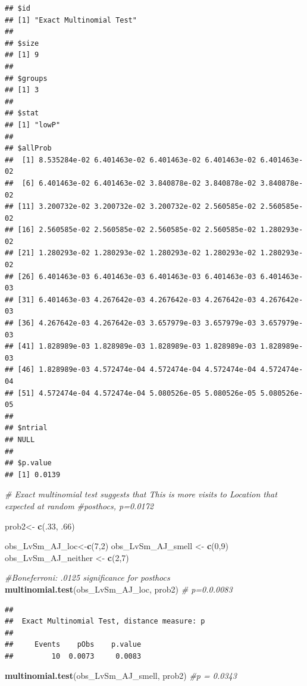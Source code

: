 \documentclass[]{article}
\newenvironment{Shaded}{\begin{snugshade}}{\end{snugshade}}
\newcommand{\KeywordTok}[1]{\textcolor[rgb]{0.13,0.29,0.53}{\textbf{{#1}}}}
\newcommand{\DecValTok}[1]{\textcolor[rgb]{0.00,0.00,0.81}{{#1}}}
\newcommand{\StringTok}[1]{\textcolor[rgb]{0.31,0.60,0.02}{{#1}}}
\newcommand{\CommentTok}[1]{\textcolor[rgb]{0.56,0.35,0.01}{\textit{{#1}}}}
\newcommand{\NormalTok}[1]{{#1}}
\begin{document}
\begin{verbatim}
## $id
## [1] "Exact Multinomial Test"
## 
## $size
## [1] 9
## 
## $groups
## [1] 3
## 
## $stat
## [1] "lowP"
## 
## $allProb
##  [1] 8.535284e-02 6.401463e-02 6.401463e-02 6.401463e-02 6.401463e-02
##  [6] 6.401463e-02 6.401463e-02 3.840878e-02 3.840878e-02 3.840878e-02
## [11] 3.200732e-02 3.200732e-02 3.200732e-02 2.560585e-02 2.560585e-02
## [16] 2.560585e-02 2.560585e-02 2.560585e-02 2.560585e-02 1.280293e-02
## [21] 1.280293e-02 1.280293e-02 1.280293e-02 1.280293e-02 1.280293e-02
## [26] 6.401463e-03 6.401463e-03 6.401463e-03 6.401463e-03 6.401463e-03
## [31] 6.401463e-03 4.267642e-03 4.267642e-03 4.267642e-03 4.267642e-03
## [36] 4.267642e-03 4.267642e-03 3.657979e-03 3.657979e-03 3.657979e-03
## [41] 1.828989e-03 1.828989e-03 1.828989e-03 1.828989e-03 1.828989e-03
## [46] 1.828989e-03 4.572474e-04 4.572474e-04 4.572474e-04 4.572474e-04
## [51] 4.572474e-04 4.572474e-04 5.080526e-05 5.080526e-05 5.080526e-05
## 
## $ntrial
## NULL
## 
## $p.value
## [1] 0.0139
\end{verbatim}

\begin{Shaded}
\begin{Highlighting}[]
\CommentTok{# Exact multinomial test suggests that This is more visits to Location that expected at random}
\CommentTok{#posthocs, p=0.0172}

\NormalTok{prob2<-}\StringTok{ }\KeywordTok{c}\NormalTok{(.}\DecValTok{33}\NormalTok{, .}\DecValTok{66}\NormalTok{)}

\NormalTok{obs_LvSm_AJ_loc<-}\KeywordTok{c}\NormalTok{(}\DecValTok{7}\NormalTok{,}\DecValTok{2}\NormalTok{)}
\NormalTok{obs_LvSm_AJ_smell <-}\StringTok{ }\KeywordTok{c}\NormalTok{(}\DecValTok{0}\NormalTok{,}\DecValTok{9}\NormalTok{)}
\NormalTok{obs_LvSm_AJ_neither <-}\StringTok{ }\KeywordTok{c}\NormalTok{(}\DecValTok{2}\NormalTok{,}\DecValTok{7}\NormalTok{)}

\CommentTok{#Boneferroni: .0125 significance for posthocs}
 \KeywordTok{multinomial.test}\NormalTok{(obs_LvSm_AJ_loc, prob2) }\CommentTok{# p=0.0.0083}
\end{Highlighting}
\end{Shaded}

\begin{verbatim}
## 
##  Exact Multinomial Test, distance measure: p
## 
##     Events    pObs    p.value
##         10  0.0073     0.0083
\end{verbatim}

\begin{Shaded}
\begin{Highlighting}[]
 \KeywordTok{multinomial.test}\NormalTok{(obs_LvSm_AJ_smell, prob2) }\CommentTok{#p = 0.0343}
\end{Highlighting}
\end{Shaded}
\end{document}
